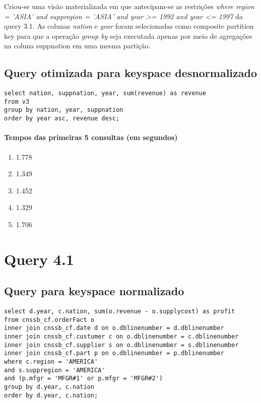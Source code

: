 \documentclass[12pt]{article}
\begin{document}
Criou-se uma visão materializada em que antecipam-se as restrições \emph{where region = 'ASIA' and suppregion = 'ASIA' and year \textgreater= 1992 and year \textless= 1997} da query 3.1. As colunas \emph{nation} e \emph{year} foram selecionadas como composite partition key para que a operação \emph{group by} seja executada apenas por meio de agregações na coluna suppnation em uma mesma partição.

\subsection{Query otimizada para keyspace desnormalizado}

\begin{lstlisting}
select nation, suppnation, year, sum(revenue) as revenue 
from v3
group by nation, year, suppnation
order by year asc, revenue desc; 
\end{lstlisting}

\paragraph{Tempos das primeiras 5 consultas (em segundos)}
\begin{enumerate}
\item 1.778
\item 1.349
\item 1.452
\item 1.329
\item 1.706
\end{enumerate}

\section{Query 4.1}

\subsection{Query para keyspace normalizado}

\begin{lstlisting}
select d.year, c.nation, sum(o.revenue - o.supplycost) as profit 
from cnssb_cf.orderFact o
inner join cnssb_cf.date d on o.dblinenumber = d.dblinenumber
inner join cnssb_cf.custumer c on o.dblinenumber = c.dblinenumber 
inner join cnssb_cf.supplier s on o.dblinenumber = s.dblinenumber
inner join cnssb_cf.part p on o.dblinenumber = p.dblinenumber 
where c.region = 'AMERICA'
and s.suppregion = 'AMERICA'
and (p.mfgr = 'MFGR#1' or p.mfgr = 'MFGR#2')
group by d.year, c.nation
order by d.year, c.nation;
\end{lstlisting}
\end{document}
